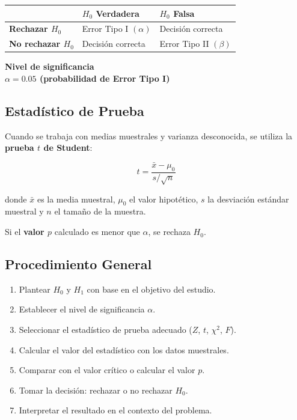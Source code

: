 \documentclass[12pt,a4paper]{article}
\newcommand{\cajaresultado}[2]{%
  \begin{center}
    \colorbox{cremoso}{%
      \parbox{0.85\textwidth}{%
        \vspace{4pt}
        \centering
        \textbf{\textcolor{cafeoscuro}{#1}} \\[4pt]
        \Large\textcolor{cafemedio}{\textbf{#2}}
        \vspace{4pt}
      }
    }
  \end{center}
}
\begin{document}
\begin{center}
\begin{tabular}{>{\bfseries}p{4cm} p{4.5cm} p{4.5cm}}
\toprule
\rowcolor{cafesuave}
 & \textbf{$H_0$ Verdadera} & \textbf{$H_0$ Falsa} \\
\midrule
Rechazar $H_0$   & Error Tipo I $(\alpha)$    & Decisión correcta \\
\rowcolor{grisclaro}
No rechazar $H_0$ & Decisión correcta         & Error Tipo II $(\beta)$ \\
\bottomrule
\end{tabular}
\end{center}

\vspace{0.5cm}

\cajaresultado{Nivel de significancia}{$\alpha = 0.05$ \quad (probabilidad de Error Tipo I)}

\subsection{Estadístico de Prueba}

Cuando se trabaja con medias muestrales y varianza desconocida, se utiliza la
\textbf{prueba $t$ de Student}:

\begin{equation}
  t = \frac{\bar{x} - \mu_0}{s / \sqrt{n}}
\end{equation}

donde $\bar{x}$ es la media muestral, $\mu_0$ el valor hipotético, $s$ la desviación estándar
muestral y $n$ el tamaño de la muestra.

Si el \textbf{valor $p$} calculado es menor que $\alpha$, se rechaza $H_0$.

\subsection{Procedimiento General}

\begin{enumerate}[leftmargin=1.5cm, label=\textbf{\textcolor{cafeoscuro}{\arabic*.}}]
  \item Plantear $H_0$ y $H_1$ con base en el objetivo del estudio.
  \item Establecer el nivel de significancia $\alpha$.
  \item Seleccionar el estadístico de prueba adecuado ($Z$, $t$, $\chi^2$, $F$).
  \item Calcular el valor del estadístico con los datos muestrales.
  \item Comparar con el valor crítico o calcular el valor $p$.
  \item Tomar la decisión: rechazar o no rechazar $H_0$.
  \item Interpretar el resultado en el contexto del problema.
\end{enumerate}
\end{document}
